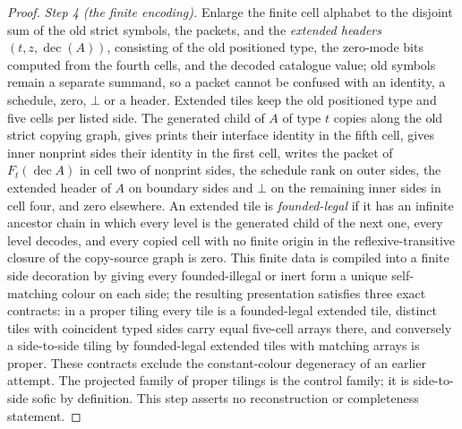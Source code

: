 \begin{proof}
\emph{Step 4 (the finite encoding).}  Enlarge the finite cell alphabet to
the disjoint sum of the old strict symbols, the packets, and the
\emph{extended headers} $(t,z,\operatorname{dec}(A))$, consisting of the
old positioned type, the zero-mode bits computed from the fourth cells, and
the decoded catalogue value; old symbols remain a separate summand, so a
packet cannot be confused with an identity, a schedule, zero, $\bot$ or a
header.  Extended tiles keep the old positioned type and five cells per
listed side.  The generated child of $A$ of type $t$ copies along the old
strict copying graph, gives prints their interface identity in the fifth
cell, gives inner nonprint sides their identity in the first cell, writes
the packet of $F_t(\operatorname{dec}A)$ in cell two of nonprint sides, the
schedule rank on outer sides, the extended header of $A$ on boundary sides
and $\bot$ on the remaining inner sides in cell four, and zero elsewhere.
An extended tile is \emph{founded-legal} if it has an infinite ancestor
chain in which every level is the generated child of the next one, every
level decodes, and every copied cell with no finite origin in the
reflexive-transitive closure of the copy-source graph is zero.  This finite
data is compiled into a finite side decoration by giving every
founded-illegal or inert form a unique self-matching colour on each side;
the resulting presentation satisfies three exact contracts: in a proper
tiling every tile is a founded-legal extended tile, distinct tiles with
coincident typed sides carry equal five-cell arrays there, and conversely a
side-to-side tiling by founded-legal extended tiles with matching arrays is
proper.  These contracts exclude the constant-colour degeneracy of an
earlier attempt.  The projected family of proper tilings is the control
family; it is side-to-side sofic by definition.  This step asserts no
reconstruction or completeness statement.


\end{proof}

